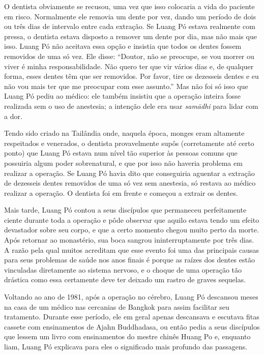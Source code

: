 O dentista obviamente se recusou, uma vez que isso colocaria a vida do
paciente em risco. Normalmente ele removia um dente por vez, dando um
período de dois ou três dias de intervalo entre cada extração. Se Luang
Pó estava realmente com pressa, o dentista estava disposto a remover um
dente por dia, mas não mais que isso. Luang Pó não aceitava essa opção e
insistia que todos os dentes fossem removidos de uma só vez. Ele disse:
``Doutor, não se preocupe, se vou morrer ou viver é minha
responsabilidade. Não quero ter que vir vários dias e, de qualquer
forma, esses dentes têm que ser removidos. Por favor, tire os dezesseis
dentes e eu não vou mais ter que me preocupar com esse assunto.'' Mas
não foi só isso que Luang Pó pediu ao médico: ele também insistiu que a
operação inteira fosse realizada sem o uso de anestesia; a intenção dele
era usar \emph{samādhi} para lidar com a dor.

Tendo sido criado na Tailândia onde, naquela época, monges eram
altamente respeitados e venerados, o dentista provavelmente supôs
(corretamente até certo ponto) que Luang Pó estava num nível tão
superior às pessoas comuns que possuiria algum poder sobrenatural, e que
por isso não haveria problema em realizar a operação. Se Luang Pó havia
dito que conseguiria aguentar a extração de dezesseis dentes removidos
de uma só vez sem anestesia, só restava ao médico realizar a operação. O
dentista foi em frente e começou a extrair os dentes.

Mais tarde, Luang Pó contou a seus discípulos que permaneceu
perfeitamente ciente durante toda a operação e pôde observar que aquilo
estava tendo um efeito devastador sobre seu corpo, e que a certo momento
chegou muito perto da morte. Após retornar ao monastério, sua boca
sangrou ininterruptamente por três dias. A razão pela qual muitos
acreditam que esse evento foi uma das principais causas para seus
problemas de saúde nos anos finais é porque as raízes dos dentes estão
vinculadas diretamente ao sistema nervoso, e o choque de uma operação
tão drástica como essa certamente deve ter deixado um rastro de graves
sequelas.

Voltando ao ano de 1981, após a operação no cérebro, Luang Pó descansou
meses na casa de um médico nas cercanias de Bangkok para assim facilitar
seu tratamento. Durante esse período, ele em geral apenas descansava e
escutava fitas cassete com ensinamentos de Ajahn Buddhadasa, ou então
pedia a seus discípulos que lessem um livro com ensinamentos do mestre
chinês Huang Po e, enquanto liam, Luang Pó explicava para eles o
significado mais profundo das passagens.

